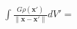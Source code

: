 \documentclass[preview]{standalone}
\begin{document}
\begin{align*}
\int\frac{G\rho(\mathbf x')}{\|\mathbf x-\mathbf x'\|} dV' =
\end{align*}
\end{document}

